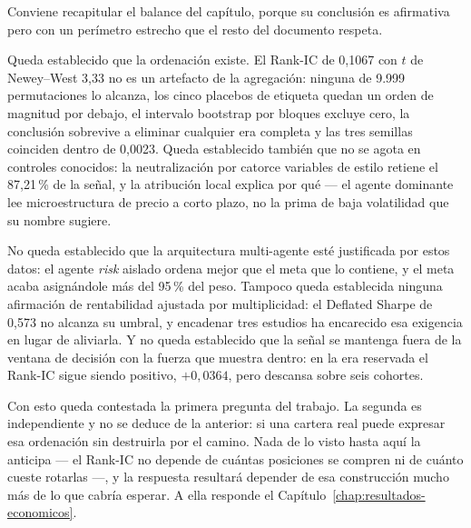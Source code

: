 Conviene recapitular el balance del capítulo, porque su conclusión es afirmativa pero con un
perímetro estrecho que el resto del documento respeta.

Queda establecido que la ordenación existe. El Rank-IC de 0,1067 con $t$ de Newey--West 3,33 no es
un artefacto de la agregación: ninguna de 9.999 permutaciones lo alcanza, los cinco placebos de
etiqueta quedan un orden de magnitud por debajo, el intervalo bootstrap por bloques excluye cero,
la conclusión sobrevive a eliminar cualquier era completa y las tres semillas coinciden dentro de
0,0023. Queda establecido también que no se agota en controles conocidos: la neutralización por
catorce variables de estilo retiene el 87,21\,\% de la señal, y la atribución local explica por qué
--- el agente dominante lee microestructura de precio a corto plazo, no la prima de baja volatilidad
que su nombre sugiere.

No queda establecido que la arquitectura multi-agente esté justificada por estos datos: el agente
\textit{risk} aislado ordena mejor que el meta que lo contiene, y el meta acaba asignándole más del
95\,\% del peso. Tampoco queda establecida ninguna afirmación de rentabilidad ajustada por
multiplicidad: el Deflated Sharpe de 0,573 no alcanza su umbral, y encadenar tres estudios ha
encarecido esa exigencia en lugar de aliviarla. Y no queda establecido que la señal se mantenga
fuera de la ventana de decisión con la fuerza que muestra dentro: en la era reservada el Rank-IC
sigue siendo positivo, $+0{,}0364$, pero descansa sobre seis cohortes.

Con esto queda contestada la primera pregunta del trabajo. La segunda es independiente y no se
deduce de la anterior: si una cartera real puede expresar esa ordenación sin destruirla por el
camino. Nada de lo visto hasta aquí la anticipa --- el Rank-IC no depende de cuántas posiciones se
compren ni de cuánto cueste rotarlas ---, y la respuesta resultará depender de esa construcción
mucho más de lo que cabría esperar. A ella responde el Capítulo~\ref{chap:resultados-economicos}.
